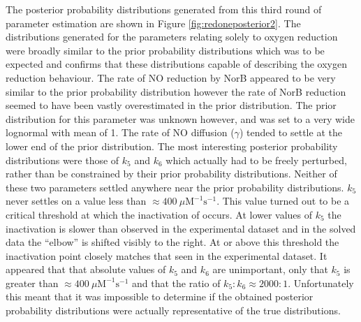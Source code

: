 The posterior probability distributions generated from this third round of parameter estimation are shown in Figure \ref{fig:redoneposterior2}. The distributions generated for the parameters relating solely to oxygen reduction were broadly similar to the prior probability distributions which was to be expected and confirms that these distributions capable of describing the oxygen reduction behaviour. The rate of NO reduction by NorB appeared to be very similar to the prior probability distribution however the rate of NorB reduction seemed to have been vastly overestimated in the prior distribution. The prior distribution for this parameter was unknown however, and was set to a very wide lognormal with mean of 1. The rate of NO diffusion ($\gamma$) tended to settle at the lower end of the prior distribution. The most interesting posterior probability distributions were those of $k_5$ and $k_6$ which actually had to be freely perturbed, rather than be constrained by their prior probability distributions. 
Neither of these two parameters settled anywhere near the prior probability distributions. $k_5$ never settles on a value less than $\approx 400~\mu \mathrm{M}^{-1}\mathrm{s}^{-1}$. This value turned out to be a critical threshold at which the inactivation of \cbbthree{} occurs. At lower values of $k_5$ the inactivation is slower than observed in the experimental dataset and in the solved data the ``elbow'' is shifted visibly to the right. At or above this threshold the inactivation point closely matches that seen in the experimental dataset. It appeared that that absolute values of $k_5$ and $k_6$ are unimportant, only that $k_5$ is greater than $\approx 400~\mu \mathrm{M}^{-1}\mathrm{s}^{-1}$ and that the ratio of $k_5:k_6 \approx 2000:1$. Unfortunately this meant that it was impossible to determine if the obtained posterior probability distributions were actually representative of the true distributions.

